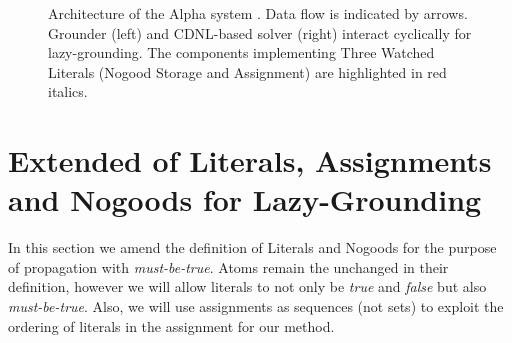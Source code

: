 \documentclass{vutinfth} %
\newtheorem{definition}{Definition}[chapter]
\newcommand{\mbt}{must-be-true\xspace}
\begin{document}
\begin{figure}[t]
\caption[Architecture of the Alpha system]{Architecture of the Alpha system \cite[Figure 1]{alpha-techniques}. Data flow is indicated by arrows. Grounder (left) and CDNL-based solver (right) interact cyclically for lazy-grounding. The components implementing Three Watched Literals (Nogood Storage and Assignment) are highlighted in red italics.}
  \label{fig:arch}
\end{figure}

\section{Extended of Literals, Assignments and Nogoods for Lazy-Grounding}


In this section we amend the definition of Literals and Nogoods for the purpose of propagation with \emph{\mbt}. Atoms remain the unchanged in their definition, however we will allow literals to not only be \emph{true} and \emph{false} but also \emph{\mbt}. Also, we will use assignments as sequences (not sets) to exploit the ordering of literals in the assignment for our method.



\end{document}
